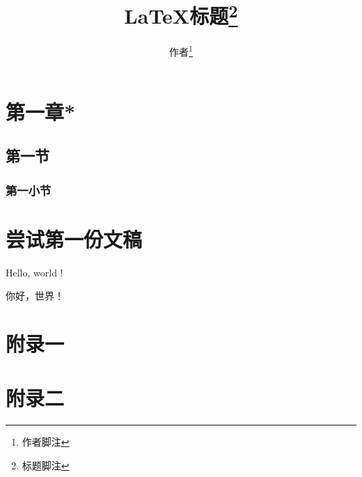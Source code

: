 \documentclass[twoside]{ctexart}
\title{\LaTeX{}标题\thanks{标题脚注}}
\author{作者\thanks{作者脚注}}
\date{}
\begin{document}
\maketitle

\renewcommand{\contentsname}{这是目录}
\renewcommand{\listfigurename}{这是插图目录}
\renewcommand{\listtablename}{这是表格目录}

\tableofcontents
\listoffigures
\listoftables

\section{第一章*}
    \subsection{第一节}
        \subsubsection{第一小节}

\section{尝试第一份文稿}
		    Hello, world ! 

		    你好，世界！


\theendnotes

\begin{appendices}
    \section{附录一}
    \section{附录二}
\end{appendices}
\end{document}
